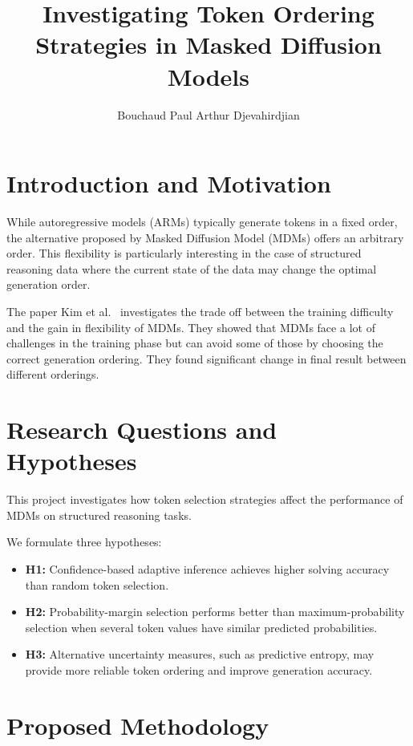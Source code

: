 \documentclass{article}
\title{Investigating Token Ordering Strategies in Masked Diffusion Models}
\author{Bouchaud Paul \quad Arthur Djevahirdjian}
\begin{document}
\maketitle

\section{Introduction and Motivation}

While autoregressive models (ARMs) typically generate tokens in a fixed order, the alternative proposed by Masked Diffusion Model (MDMs) offers an arbitrary order. This flexibility is particularly interesting in the case of structured reasoning data where the current state of the data may change the optimal generation order. 

The paper Kim et al.~\citep{kim2025train} investigates the trade off between the training difficulty and the gain in flexibility of MDMs. They showed that MDMs face a lot of challenges in the training phase but can avoid some of those by choosing the correct generation ordering. They found significant change in final result between different orderings. 

\section{Research Questions and Hypotheses}

This project investigates how token selection strategies
affect the performance of MDMs on structured reasoning tasks.

We formulate three hypotheses:

\begin{itemize}
    \item \textbf{H1:} Confidence-based adaptive inference
    achieves higher solving accuracy than random token
    selection.

    \item \textbf{H2:} Probability-margin selection performs
    better than maximum-probability selection when several
    token values have similar predicted probabilities.

    \item \textbf{H3:} Alternative uncertainty measures,
    such as predictive entropy, may provide more reliable
    token ordering and improve generation accuracy.
\end{itemize}

\section{Proposed Methodology}
\end{document}
